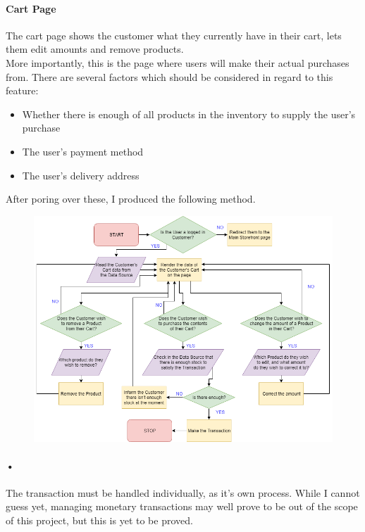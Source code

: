 ﻿\documentclass{article}
\begin{document}
    \paragraph{Cart Page}
    The cart page shows the customer what they currently have in their cart, lets them edit amounts  and remove products.\\
    More importantly, this is the page where users will make their actual purchases from.
    There are several factors which should be considered in regard to this feature:
    \begin{itemize}
    \item Whether there is enough of all products in the inventory to supply the user's purchase
    \item The user's payment method
    \item The user's delivery address
    \end{itemize}
    After poring over these, I produced the following method.
    \begin{figure}[H]
    \includegraphics[width=\textwidth]{cartPage.png}
    \centering
    \end{figure}
    \paragraph{•}
    The transaction must be handled individually, as it's own process.
    While I cannot guess yet, managing monetary transactions may well prove to be out of the scope of this project, but this is yet to be proved.
    \newpage
\end{document}
